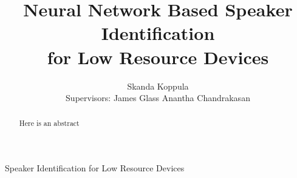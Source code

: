 \documentclass[journal,12pt,onecolumn,draftclsnofoot,]{sty/IEEEtran}
\begin{document}
%
\title{Neural Network Based Speaker Identification \\ for Low Resource Devices}

\author{Skanda Koppula \\
        Supervisors: James Glass Anantha Chandrakasan}%

% 
%



%
{Speaker Identification for Low Resource Devices}

\maketitle

\begin{abstract}
Here is an abstract
\end{abstract}
\end{document}

